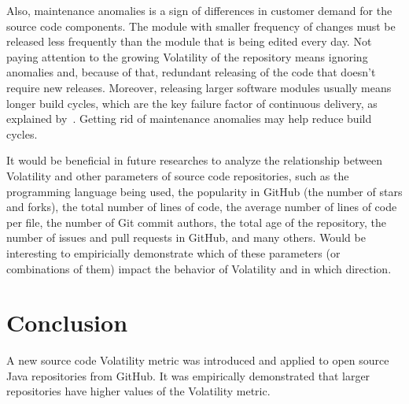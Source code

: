 \documentclass[anonymous,sigconf,10pt,nonacm=true]{acmart}
\begin{document}
Also, maintenance anomalies is a sign of differences in customer demand
for the source code components. The module with smaller frequency of changes
must be released less frequently than the module that is being edited every day.
Not paying attention to the growing Volatility of the repository means
ignoring anomalies and, because of that, redundant releasing of the code
that doesn't require new releases. Moreover, releasing larger software modules
usually means longer build cycles, which are the key failure factor of
continuous delivery, as explained by~\cite{humble2010}. Getting rid of
maintenance anomalies may help reduce build cycles.

It would be beneficial in future researches to analyze the relationship between
Volatility and other parameters of source code repositories,
such as
the programming language being used,
the popularity in GitHub (the number of stars and forks),
the total number of lines of code,
the average number of lines of code per file,
the number of Git commit authors,
the total age of the repository,
the number of issues and pull requests in GitHub,
and many others.
Would be interesting to empiricially demonstrate which of these parameters
(or combinations of them)
impact the behavior of Volatility and in which direction.

\section{Conclusion}
\label{sec:conclusion}

A new source code Volatility metric was introduced and applied
to \thetotalrepos{} open source Java repositories from GitHub. It was
empirically demonstrated that larger repositories have higher values
of the Volatility metric.




\end{document}
